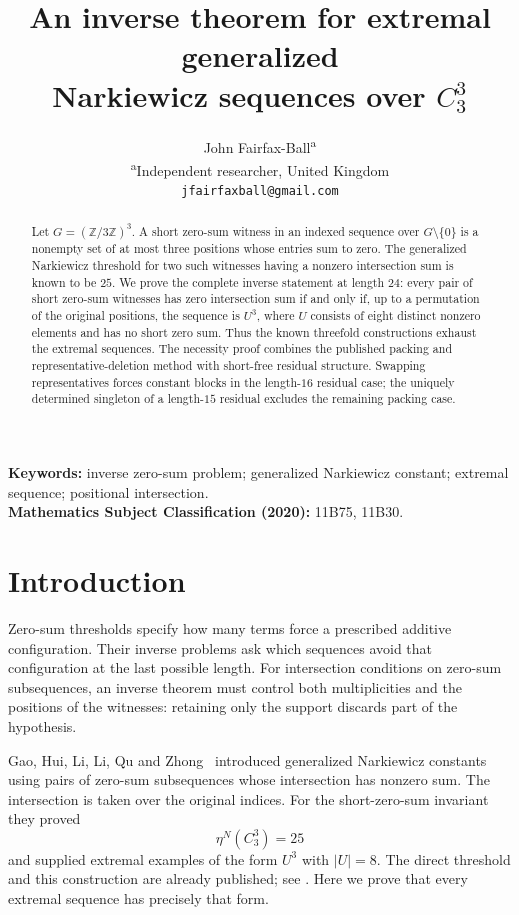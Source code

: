\documentclass[11pt]{article}
\title{An inverse theorem for extremal generalized\\ Narkiewicz sequences over $C_3^3$}
\author{John Fairfax-Ball\textsuperscript{a}\\[3pt]
\small\textsuperscript{a}Independent researcher, United Kingdom\\[2pt]
\small\texttt{jfairfaxball@gmail.com}}
\date{}
\theoremstyle{definition}
\theoremstyle{remark}
\begin{document}
\maketitle
\begin{abstract}
Let $G=(\mathbb Z/3\mathbb Z)^3$. A short zero-sum witness in an indexed
sequence over $G\setminus\{0\}$ is a nonempty set of at most three positions
whose entries sum to zero. The generalized Narkiewicz threshold for two
such witnesses having a nonzero intersection sum is known to be $25$.
We prove the complete inverse statement at length $24$: every pair of
short zero-sum witnesses has zero intersection sum if and only if, up to
a permutation of the original positions, the sequence is $U^3$, where
$U$ consists of eight distinct nonzero elements and has no short zero sum.
Thus the known threefold constructions exhaust the extremal sequences.
The necessity proof combines the published packing and representative-deletion
method with short-free residual structure. Swapping representatives forces
constant blocks in the length-$16$ residual case; the uniquely determined
singleton of a length-$15$ residual excludes the remaining packing case.
\end{abstract}

\noindent\textbf{Keywords:} inverse zero-sum problem; generalized Narkiewicz constant;
extremal sequence; positional intersection.\\
\textbf{Mathematics Subject Classification (2020):} 11B75, 11B30.

\section{Introduction}
Zero-sum thresholds specify how many terms force a prescribed additive
configuration. Their inverse problems ask which sequences avoid that
configuration at the last possible length. For intersection conditions on
zero-sum subsequences, an inverse theorem must control both multiplicities
and the positions of the witnesses: retaining only the support discards part
of the hypothesis.

Gao, Hui, Li, Li, Qu and Zhong~\cite{Gao2024} introduced generalized
Narkiewicz constants using pairs of zero-sum subsequences whose intersection
has nonzero sum. The intersection is taken over the original indices.
For the short-zero-sum invariant they proved
\begin{equation}\label{eq:threshold}
  \eta^N(C_3^3)=25
\end{equation}
and supplied extremal examples of the form $U^3$ with $|U|=8$.
The direct threshold and this construction are already published; see
\cite[Lemma 3.3(2)--(3) and Theorem 3.6(4)]{Gao2024}.
Here we prove that every extremal sequence has precisely that form.
\end{document}
